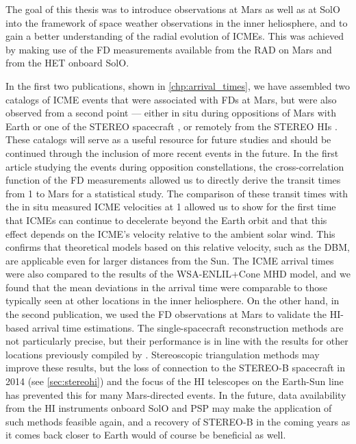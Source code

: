 The goal of this thesis was to introduce observations at Mars as well as at \ac{SolO} into the framework of space weather observations in the inner heliosphere, and to gain a better understanding of the radial evolution of \acp{ICME}. This was achieved by making use of the \ac{FD} measurements available from the \ac{RAD} on Mars and from the \ac{HET} onboard \ac{SolO}.

In the first two publications, shown in \autoref{chp:arrival_times}, we have assembled two catalogs of \ac{ICME} events that were associated with \acp{FD} at Mars, but were also observed from a second point --- either in situ during oppositions of Mars with Earth or one of the \ac{STEREO} spacecraft \citep{Forstner-2018}, or remotely from the \ac{STEREO} \acp{HI} \citep{Forstner-2019}. These catalogs will serve as a useful resource for future studies and should be continued through the inclusion of more recent events in the future.
In the first article studying the events during opposition constellations, the cross-correlation function of the \ac{FD} measurements allowed us to directly derive the transit times from \SI{1}{\AU} to Mars for a statistical study. The comparison of these transit times with the in situ measured \ac{ICME} velocities at \SI{1}{\AU} allowed us to show for the first time that \acp{ICME} can continue to decelerate beyond the Earth orbit and that this effect depends on the \ac{ICME}'s velocity relative to the ambient solar wind. This confirms that theoretical models based on this relative velocity, such as the \ac{DBM}, are applicable even for larger distances from the Sun. The \ac{ICME} arrival times were also compared to the results of the WSA-ENLIL+Cone \ac{MHD} model, and we found that the mean deviations in the arrival time were comparable to those typically seen at other locations in the inner heliosphere.
On the other hand, in the second publication, we used the \ac{FD} observations at Mars to validate the \ac{HI}-based arrival time estimations. The single-spacecraft reconstruction methods are not particularly precise, but their performance is in line with the results for other locations previously compiled by \citet{Moestl-2017-HelcatsHSO}. Stereoscopic triangulation methods may improve these results, but the loss of connection to the \ac{STEREO}-B spacecraft in 2014 (see \autoref{sec:stereohi}) and the focus of the \ac{HI} telescopes on the Earth-Sun line has prevented this for many Mars-directed events. In the future, data availability from the \ac{HI} instruments onboard \ac{SolO} and \ac{PSP} may make the application of such methods feasible again, and a recovery of \ac{STEREO}-B in the coming years as it comes back closer to Earth would of course be beneficial as well.

